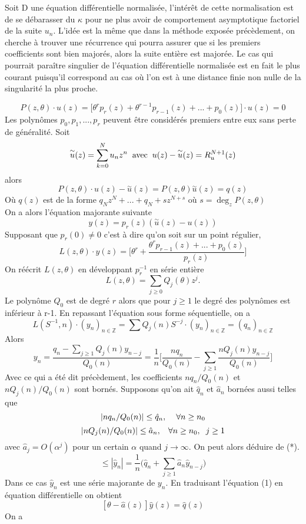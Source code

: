 \documentclass[a4paper,10.5pt]{article}
\begin{document}
	Soit D une équation différentielle normalisée, l'intérêt de cette normalisation est de se débarasser du $\kappa$ pour ne plus avoir de comportement asymptotique factoriel de la suite $u_n$. L'idée est la même que dans la méthode exposée précèdement, on cherche à trouver une récurrence qui pourra assurer que si les premiers coefficients sont bien majorés, alors la suite entière est majorée. Le cas qui pourrait paraître singulier de l'équation différentielle normalisée est en fait le plus courant puisqu'il correspond au cas où l'on est à une distance finie non nulle de la singularité la plus proche.
	
	
	\[P(z,\theta) \cdot u(z)=\big[\theta^{r}p_r(z)+\theta^{r-1}p_{r-1}(z)+...+p_0(z)\big]\cdot u(z)=0\]
	Les polynômes $p_0,p_1,...,p_r$ peuvent être considérés premiers entre eux sans perte de généralité. Soit
	 \[\overset{\sim}{u}(z)=\sum_{k=0}^{N}u_n z^n\hspace{2mm}\text{avec}\hspace{2mm}u(z)-\overset{\sim}{u}(z)=R_u^{N+1}(z)\] 
	alors 
	\[  P(z,\theta) \cdot u(z)-\overset{\sim}{u}(z)=P(z,\theta)\overset{\sim}{u}(z)=q(z)\]
	Où $q(z)$ est de la forme $q_Nz^N+...+q_N+sz^{N+s}$ où $s= \deg_{z}P(z,\theta) $ 
	\\
	On a alors l'équation majorante suivante
	\[y(z)=p_r(z)(\overset{\sim}{u}(z)-u(z))\]
	Supposant que $p_r(0) \neq 0$ c'est à dire qu'on soit sur un point régulier,
	\[L(z,\theta)\cdot y(z)=\Big[\theta^{r}+\frac{\theta^{r}p_{r-1}(z)+...+p_0(z)}{p_r(z)}\Big]\]
	On réécrit $L(z,\theta)$ en développant $p_r^{-1}$ en série entière
	\[L(z,\theta)=\sum_{j\geq 0} Q_{j}(\theta)z^j.\]
	Le polynôme $Q_0$ est de degré $r$ alors que pour $j \geq 1$ le degré des polynômes est inférieur à r-1.
	En repassant l'équation sous forme séquentielle, on a 
	\[L(S^{-1},n)\cdot (y_n)_{n \in \mathbb{Z}}=\sum Q_j(n)S^{-j} \cdot  (y_n)_{n \in \mathbb{Z}} =(q_n)_{n \in \mathbb{Z}} \]
	Alors
	\[y_n=\frac{q_n-\sum_{j\geq1}Q_j(n)y_{n-j}}{Q_0(n)}= \frac{1}{n}\Big[\frac{nq_n}{Q_0(n)}-\sum_{j\geq1}\frac{nQ_j(n)y_{n-j}}{Q_0(n)}\Big]\tag{*}\]
	Avec ce qui a été dit précèdement, les coefficients $nq_n/Q_0(n)$ et $nQ_j(n)/Q_0(n)$ sont bornés.
	Supposons qu'on ait $\hat{q}_n$ et $\hat{a}_n$ bornées aussi telles que
	\begin{equation}
	|nq_n/Q_0(n)|\leq \hat{q}_n,  \hspace{4mm}\forall n\geq n_0\\
	\end{equation}
	\begin{equation}
	|nQ_j(n)/Q_0(n)|\leq \hat{a}_n,\hspace{3mm}  \forall n\geq n_0, \hspace{2mm} j\geq 1
	\end{equation}
	avec $\hat{a}_j=O(\alpha^j)$ pour un certain $\alpha$ quand $j \rightarrow \infty$. On peut alors déduire de (*).
	\[ \leq|\hat{y}_n|=\frac{1}{n}\Big(\hat{q}_n+\sum_{j\geq1}\hat{a}_{n}\hat{y}_{n-j}\Big)\tag{1}\]
	Dans ce cas $\hat{y}_n$ est une série majorante de $y_n$. En traduisant l'équation (1) en équation différentielle on obtient
	\[[\theta-\hat{a}(z)] \hat{y}(z) = \hat{q}(z)\]
	On a 
	
\end{document}
